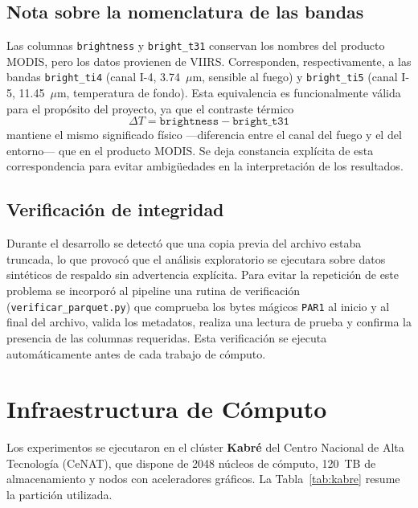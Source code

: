 \documentclass[conference]{IEEEtran}
\begin{document}
\subsection{Nota sobre la nomenclatura de las bandas}
Las columnas \texttt{brightness} y \texttt{bright\_t31} conservan los nombres del producto MODIS, pero los datos provienen de VIIRS. Corresponden, respectivamente, a las bandas \texttt{bright\_ti4} (canal I-4, 3.74~$\mu$m, sensible al fuego) y \texttt{bright\_ti5} (canal I-5, 11.45~$\mu$m, temperatura de fondo). Esta equivalencia es funcionalmente válida para el propósito del proyecto, ya que el contraste térmico
\begin{equation}
\Delta T = \texttt{brightness} - \texttt{bright\_t31}
\label{eq:deltat}
\end{equation}
mantiene el mismo significado físico —diferencia entre el canal del fuego y el del entorno— que en el producto MODIS. Se deja constancia explícita de esta correspondencia para evitar ambigüedades en la interpretación de los resultados.

\subsection{Verificación de integridad}
Durante el desarrollo se detectó que una copia previa del archivo estaba truncada, lo que provocó que el análisis exploratorio se ejecutara sobre datos sintéticos de respaldo sin advertencia explícita. Para evitar la repetición de este problema se incorporó al pipeline una rutina de verificación (\texttt{verificar\_parquet.py}) que comprueba los bytes mágicos \texttt{PAR1} al inicio y al final del archivo, valida los metadatos, realiza una lectura de prueba y confirma la presencia de las columnas requeridas. Esta verificación se ejecuta automáticamente antes de cada trabajo de cómputo.

\section{Infraestructura de Cómputo}
\label{sec:infra}

Los experimentos se ejecutaron en el clúster \textbf{Kabré} del Centro Nacional de Alta Tecnología (CeNAT), que dispone de 2048 núcleos de cómputo, 120~TB de almacenamiento y nodos con aceleradores gráficos. La Tabla~\ref{tab:kabre} resume la partición utilizada.
\end{document}
